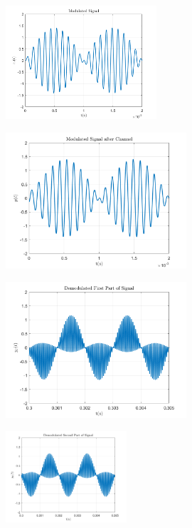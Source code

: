\documentclass[a4paper]{article}
\begin{document}
	\begin{figure}[H]
		\includegraphics[width=0.5\textwidth]{comsys_fig23.png}\\ 
		\centering
	\end{figure}\begin{figure}[H]
	\includegraphics[width=0.6\textwidth]{comsys_fig24.png}\\ 
	\centering
	\end{figure}\begin{figure}[H]
	\includegraphics[width=0.6\textwidth]{comsys_fig25.png}\\ 
	\centering
	\end{figure}\begin{figure}[H]
	\includegraphics[width=0.4\textwidth]{comsys_fig26.png}\\ 

\end{figure}
\end{document}
